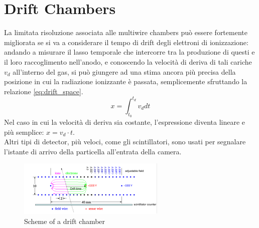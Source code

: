 \documentclass[a4paper,11pt]{book}
\begin{document}
\section{Drift Chambers}
La limitata risoluzione associata alle multiwire chambers può essere fortemente migliorata se si va a considerare il tempo di drift degli elettroni di ionizzazione: andando a misurare il lasso temporale che intercorre tra la produzione di questi e il loro raccoglimento nell'anodo, e conoscendo la velocità di deriva di tali cariche $v_d$ all'interno del gas, si può giungere ad una stima ancora più precisa della posizione in cui la radiazione ionizzante è passata, semplicemente sfruttando la relazione \ref{eq:drift_space}.
\begin{equation}
\label{eq:drift_space}
x = \int^{t_d}_{t_0} v_d dt
\end{equation}
Nel caso in cui la velocità di deriva sia costante, l'espressione diventa lineare e più semplice: $x = v_d\cdot t$.\\
Altri tipi di detector, più veloci, come gli scintillatori, sono usati per segnalare l'istante di arrivo della particella all'entrata della camera.\\

\begin{figure}[hbtp]
\centering
\includegraphics[scale=2]{pictures/drift_chamber_scheme.pdf}
\caption{Scheme of a drift chamber}
\label{fig:drift_chamber_scheme}
\end{figure}
\end{document}
